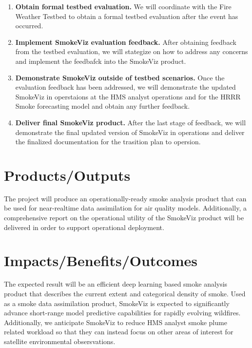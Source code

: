 \begin{enumerate}
    \item \textbf{Obtain formal testbed evaluation.}  We will coordinate with the Fire Weather Testbed to obtain a formal testbed evaluation after the event has occurred. 

    \item \textbf{Implement SmokeViz evaluation feedback.} After obtaining feedback from the testbed evaluation, we will stategize on how to address any concerns and implement the feedbafck into the SmokeViz product. 

    \item \textbf{Demonstrate SmokeViz outside of testbed scenarios.} Once the evaluation feedback has been addressed, we will demonstrate the updated SmokeViz in operstaions at the HMS analyst operations and for the HRRR Smoke forecasting model and obtain any further feedback. 

    \item \textbf{Deliver final SmokeViz product.} After the last stage of feedback, we will demonstrate the final updated version of SmokeViz in operations and deliver the finalized documentation for the trasition plan to opersion.

\end{enumerate}


\section{Products/Outputs}

The project will produce an operationally-ready smoke analysis product that can be used for near-realtime data assimilation for air quality models. Additionally, a comprehensive report on the operational utility of the SmokeViz product will be delivered in order to support operational deployment.


\section{Impacts/Benefits/Outcomes}

The expected result will be an efficient deep learning based smoke analysis product that describes the current extent and categorical density of smoke. Used as a smoke data assimilation product, SmokeViz is expected to significantly advance short-range model predictive capabilities for rapidly evolving wildfires. Additionally, we anticipate SmokeViz to reduce HMS analyst smoke plume related workload so that they can instead focus on other areas of interest for satellite environmental obsersvations.

